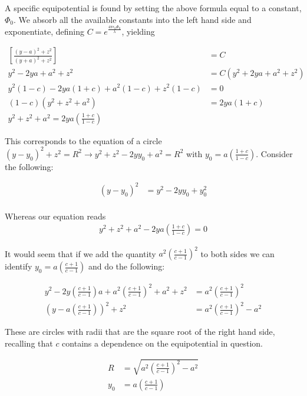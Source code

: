 \documentclass[paper=a4, fontsize=11pt]{scrartcl} %
\numberwithin{equation}{section} %
\numberwithin{figure}{section} %
\numberwithin{table}{section} %
\begin{document}
A specific equipotential is found by setting the above formula equal to a constant, $\Phi_0$. We absorb all the available constants into the left hand side and exponentiate, defining $C = e^{\frac{4 \pi \epsilon_0 \Phi_0}{\lambda}}$, yielding 

\begin{align}
\left[\frac{(y-a)^2 + z^2}{(y+a)^2 + z^2}\right] &= C \\
y^2 - 2 y a + a^2 + z^2 &= C(y^2 + 2ya + a^2 + z^2) \\
y^2(1-c) - 2ya(1+c) + a^2(1-c) + z^2(1-c) &= 0 \\
(1-c)(y^2 + z^2 + a^2) &= 2ya(1+c)\\
y^2 + z^2 + a^2 = 2ya\left(\frac{1+c}{1-c}\right)
\end{align}

This corresponds to the equation of a circle $(y-y_0)^2 + z^2 = R^2 \rightarrow y^2 + z^2 - 2yy_0 + a^2 = R^2$ with $y_0 = a\left(\frac{1+c}{1-c}\right)$. Consider the following:

\begin{align}
(y - y_0)^2 &= y^2 - 2yy_0 + y_0^2 \\
\end{align}

Whereas our equation reads
\begin{align}
y^2 + z^2 + a^2 - 2ya\left(\frac{1+c}{1-c}\right) = 0
\end{align}

It would seem that if we add the quantity $a^2 \left(\frac{c+1}{c-1}\right)^2$ to both sides we can identify $y_0 = a\left(\frac{c+1}{c-1}\right)$ and do the following:

\begin{align}
y^2 - 2y\left(\frac{c + 1}{c-1}\right)a + a^2\left(\frac{c+1}{c-1}\right)^2 + a^2 + z^2 &= a^2 \left(\frac{c+1}{c-1}\right)^2 \\
\left(y - a\left(\frac{c+1}{c-1}\right)\right)^2 + z^2 &= a^2\left(\frac{c+1}{c-1}\right)^2 - a^2 
\end{align}

These are circles with radii that are the square root of the right hand side, recalling that $c$ contains a dependence on the equipotential in question.

\begin{align}
R &= \sqrt{a^2\left(\frac{c+1}{c-1}\right)^2 - a^2} \\
y_0 &= a\left(\frac{c+1}{c-1}\right) 
\end{align}
\end{document}
